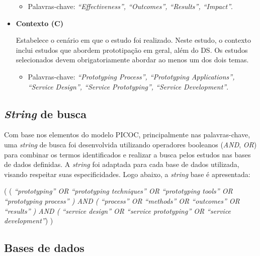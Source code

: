 \begin{itemize}
	\begin{itemize}
		\item Palavras-chave:\textit{ ``Effectiveness'', ``Outcomes'', ``Results'', ``Impact''}.
	\end{itemize} 
	
	\item \textbf{Contexto (C)}
	
	Estabelece o cenário em que o estudo foi realizado.
	Neste estudo, o contexto inclui estudos que abordem prototipação em geral, além do DS. Os estudos selecionados devem obrigatoriamente abordar ao menos um dos dois temas.
	
	\begin{itemize}
		\item Palavras-chave: \textit{``Prototyping Process'', ``Prototyping Applications'', ``Service Design'', ``Service Prototyping'', ``Service Development''}.
	\end{itemize}
	
\end{itemize}

\subsection{\textit{String} de busca}

Com base nos elementos do modelo PICOC, principalmente nas palavras-chave, uma \textit{string} de busca foi desenvolvida utilizando operadores booleanos (\textit{AND}, \textit{OR}) para combinar os termos identificados e realizar a busca pelos estudos nas bases de dados definidas. A \textit{string} foi adaptada para cada base de dados utilizada, visando respeitar suas especificidades. Logo abaixo, a \textit{string} base é apresentada:

( (\textit{ ``prototyping'' OR ``prototyping techniques'' OR ``prototyping tools'' OR ``prototyping process'' ) AND ( ``process'' OR ``methods'' OR ``outcomes'' OR ``results'' ) AND ( ``service design'' OR ``service prototyping'' OR ``service development''}) )


\subsection{Bases de dados}

